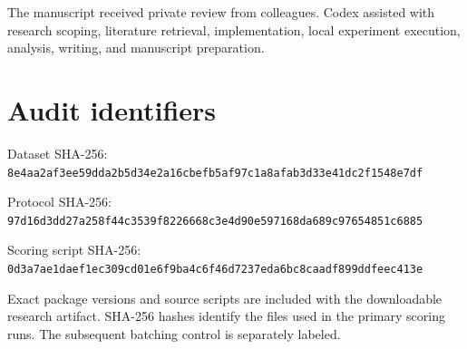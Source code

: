 \documentclass[11pt,letterpaper]{article}
\begin{document}
The manuscript received private review from colleagues. Codex assisted with research scoping, literature retrieval, implementation, local experiment execution, analysis, writing, and manuscript preparation.




\appendix

\section{Audit identifiers}

Dataset SHA-256: \nolinkurl{8e4aa2af3ee59dda2b5d34e2a16cbefb5af97c1a8afab3d33e41dc2f1548e7df}


Protocol SHA-256: \nolinkurl{97d16d3dd27a258f44c3539f8226668c3e4d90e597168da689c97654851c6885}


Scoring script SHA-256: \nolinkurl{0d3a7ae1daef1ec309cd01e6f9ba4c6f46d7237eda6bc8caadf899ddfeec413e}


Exact package versions and source scripts are included with the downloadable research artifact. SHA-256 hashes identify the files used in the primary scoring runs. The subsequent batching control is separately labeled.
\end{document}
